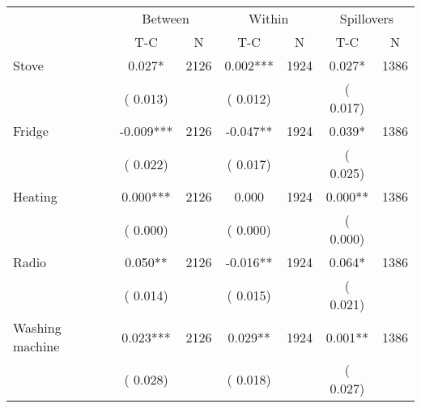 
\begin{tabular}{l*{6}{c}}\hline&\multicolumn{2}{c}{Between}&\multicolumn{2}{c}{Within}&\multicolumn{2}{c}{Spillovers} \\ \cmidrule(r){2-3}\cmidrule(l){4-5}\cmidrule(l){6-7} & {T-C} & {N} & {T-C} & {N}  & {T-C}  & {N}  \\ \midrule
Stove        &              0.027*      &       2126       &              0.002***      &       1924       &              0.027*      &       1386       \\
                       &       (       0.013)            &                               &       (       0.012)            &                               &       (       0.017)            &                               \\
Fridge        &             -0.009***      &       2126       &             -0.047**      &       1924       &              0.039*      &       1386       \\
                       &       (       0.022)            &                               &       (       0.017)            &                               &       (       0.025)            &                               \\
Heating        &              0.000***      &       2126       &              0.000      &       1924       &              0.000**      &       1386       \\
                       &       (       0.000)            &                               &       (       0.000)            &                               &       (       0.000)            &                               \\
Radio        &              0.050**      &       2126       &             -0.016**      &       1924       &              0.064*      &       1386       \\
                       &       (       0.014)            &                               &       (       0.015)            &                               &       (       0.021)            &                               \\
Washing machine        &              0.023***      &       2126       &              0.029**      &       1924       &              0.001**      &       1386       \\
                       &       (       0.028)            &                               &       (       0.018)            &                               &       (       0.027)            &                               \\

\end{tabular}
